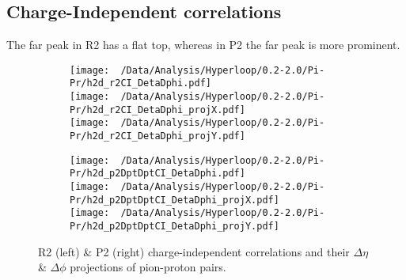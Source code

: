 \documentclass[12pt,a4paper,twoside]{report}
\begin{document}
\subsection{Charge-Independent correlations}
The far peak in R2 has a flat top, whereas in P2 the far peak is more prominent.
\begin{figure}[H]
	\begin{subfigure}{0.49\linewidth}
		\texttt{[image: ~/Data/Analysis/Hyperloop/0.2-2.0/Pi-Pr/h2d\_r2CI\_DetaDphi.pdf]}\\
		\texttt{[image: ~/Data/Analysis/Hyperloop/0.2-2.0/Pi-Pr/h2d\_r2CI\_DetaDphi\_projX.pdf]}\\
		\texttt{[image: ~/Data/Analysis/Hyperloop/0.2-2.0/Pi-Pr/h2d\_r2CI\_DetaDphi\_projY.pdf]}\\
	\end{subfigure}
	\begin{subfigure}{0.49\linewidth}
		\texttt{[image: ~/Data/Analysis/Hyperloop/0.2-2.0/Pi-Pr/h2d\_p2DptDptCI\_DetaDphi.pdf]}\\
		\texttt{[image: ~/Data/Analysis/Hyperloop/0.2-2.0/Pi-Pr/h2d\_p2DptDptCI\_DetaDphi\_projX.pdf]}\\
		\texttt{[image: ~/Data/Analysis/Hyperloop/0.2-2.0/Pi-Pr/h2d\_p2DptDptCI\_DetaDphi\_projY.pdf]}\\
	\end{subfigure}
	\caption{R2 (left) \& P2 (right) charge-independent correlations and their $\Delta\eta$ \& $\Delta\phi$ projections of pion-proton pairs.}
\end{figure}
\end{document}
